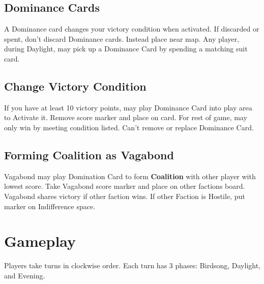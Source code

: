 \documentclass[12pt]{article}
\begin{document}
\begin{multicols*}{2}
\subsection*{Dominance Cards}
A Dominance card changes your victory condition when activated. If discarded or spent, don't discard Dominance cards. Instead place near map. Any player, during Daylight, may pick up a Dominance Card by spending a matching suit card.

\subsection*{Change Victory Condition}
If you have at least 10 victory points, may play Dominance Card into play area to Activate it. Remove score marker and place on card. For rest of game, may only win by meeting condition listed. Can't remove or replace Dominance Card.

\subsection*{Forming Coalition as Vagabond}
Vagabond may play Domination Card to form \textbf{Coalition} with other player with lowest score. Take Vagabond score marker and place on other factions board. Vagabond shares victory if other faction wins. If other Faction is Hostile, put marker on Indifference space.

\section*{Gameplay}
Players take turns in clockwise order. Each turn has 3 phases: Birdsong, Daylight, and Evening.

\end{multicols*}
\end{document}
